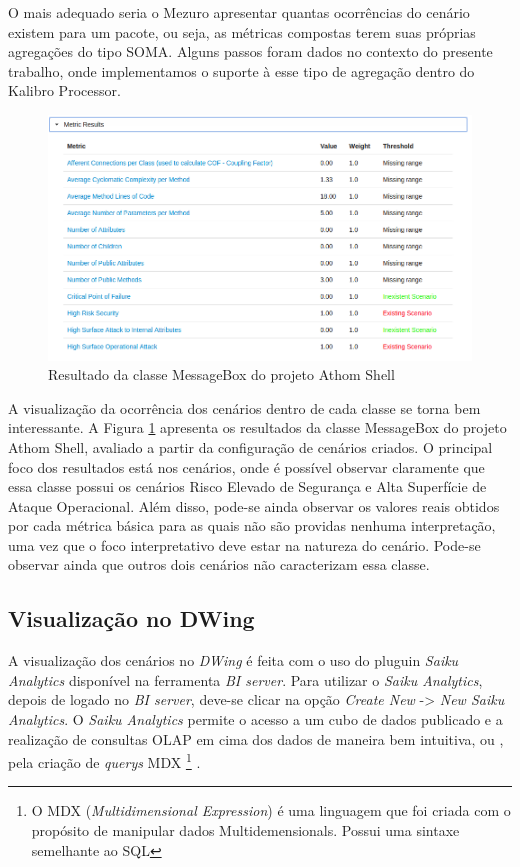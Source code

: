 O mais adequado seria o Mezuro apresentar quantas ocorrências do cenário existem para um pacote, ou seja, as métricas compostas terem suas próprias agregações do tipo SOMA. Alguns passos foram dados no contexto do presente trabalho, onde implementamos o suporte à esse tipo de agregação dentro do Kalibro Processor. 

\begin{figure}
	\centering
	\includegraphics[scale=0.5]{figuras/message_box_class}
	\caption{Resultado da classe MessageBox do projeto Athom Shell}
	\label{message_box_class}
\end{figure}

A visualização da ocorrência dos cenários dentro de cada classe se torna bem interessante. A Figura \ref{message_box_class} apresenta os resultados da classe MessageBox do projeto Athom Shell, avaliado a partir da configuração de cenários criados. O principal foco dos resultados está nos cenários, onde é possível observar claramente que essa classe possui os cenários Risco Elevado de Segurança e Alta Superfície de Ataque Operacional. Além disso, pode-se ainda observar os valores reais obtidos por cada métrica básica para as quais não são providas nenhuma interpretação, uma vez que o foco interpretativo deve estar na natureza do cenário. Pode-se observar ainda que outros dois cenários não caracterizam essa classe.



\subsection{Visualização no DWing}
\label{vision-dw}

A visualização dos cenários no \emph{DWing} é feita com o uso do pluguin \emph{Saiku Analytics} disponível na ferramenta \emph{BI server}. Para utilizar o \emph{Saiku Analytics}, depois de logado no \emph{BI server}, deve-se clicar na opção \emph{Create New} -> \emph{New Saiku Analytics}. O \emph{Saiku Analytics} permite o acesso a um cubo de dados publicado e a realização de consultas OLAP em cima dos dados de maneira bem intuitiva, ou , pela criação de \emph{querys} MDX
\footnote{O MDX (\emph{Multidimensional Expression}) é uma linguagem que foi criada com o propósito de manipular dados Multidemensionals. Possui uma sintaxe semelhante ao SQL}
. 

